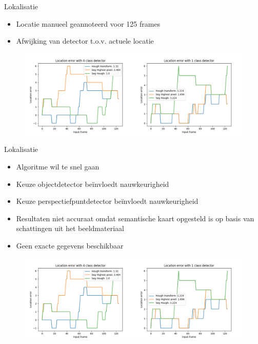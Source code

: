 \documentclass[11pt,t]{beamer}
\begin{document}
\begin{frame}[fragile]{Lokalisatie}
	\begin{itemize}
		\item Locatie manueel geannoteerd voor 125 frames
		\item Afwijking van detector t.o.v. actuele locatie
	\end{itemize}

	\begin{figure}
		\centering
		\includegraphics[width=\linewidth]{graphics/loc_acc.png}
	\end{figure}
\end{frame}

\begin{frame}[fragile]{Lokalisatie}
	\begin{itemize}
		\item Algoritme wil te snel gaan
		\item Keuze objectdetector be\"{i}nvloedt nauwkeurigheid
		\item Keuze perspectiefpuntdetector be\"{i}nvloedt nauwkeurigheid
		\item Resultaten niet accuraat omdat semantische kaart opgesteld is op basis van schattingen uit het beeldmateriaal
		\item Geen exacte gegevens beschikbaar
	\end{itemize}

	\begin{figure}
		\centering
		\includegraphics[width=0.8\linewidth]{graphics/loc_acc.png}
	\end{figure}
\end{frame}
\end{document}
